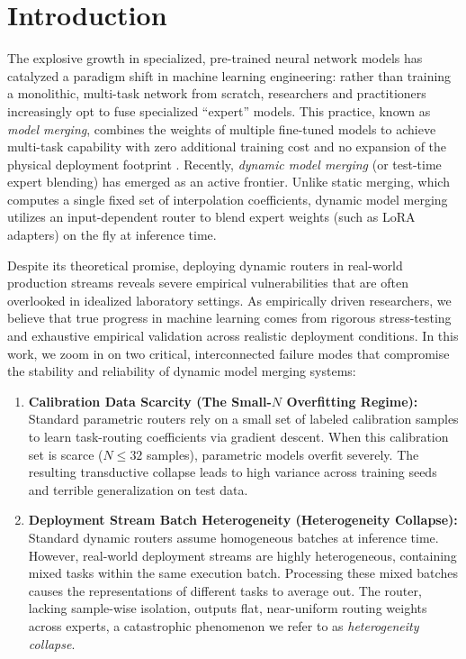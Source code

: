 \section{Introduction}
\label{sec:intro}

The explosive growth in specialized, pre-trained neural network models has catalyzed a paradigm shift in machine learning engineering: rather than training a monolithic, multi-task network from scratch, researchers and practitioners increasingly opt to fuse specialized ``expert'' models. This practice, known as \emph{model merging}, combines the weights of multiple fine-tuned models to achieve multi-task capability with zero additional training cost and no expansion of the physical deployment footprint \cite{Wortsman2022}. Recently, \emph{dynamic model merging} (or test-time expert blending) has emerged as an active frontier. Unlike static merging, which computes a single fixed set of interpolation coefficients, dynamic model merging utilizes an input-dependent router to blend expert weights (such as LoRA adapters) on the fly at inference time.

Despite its theoretical promise, deploying dynamic routers in real-world production streams reveals severe empirical vulnerabilities that are often overlooked in idealized laboratory settings. As empirically driven researchers, we believe that true progress in machine learning comes from rigorous stress-testing and exhaustive empirical validation across realistic deployment conditions. In this work, we zoom in on two critical, interconnected failure modes that compromise the stability and reliability of dynamic model merging systems:

\begin{enumerate}
    \item \textbf{Calibration Data Scarcity (The Small-$N$ Overfitting Regime):} Standard parametric routers rely on a small set of labeled calibration samples to learn task-routing coefficients via gradient descent. When this calibration set is scarce ($N \le 32$ samples), parametric models overfit severely. The resulting transductive collapse leads to high variance across training seeds and terrible generalization on test data.
    \item \textbf{Deployment Stream Batch Heterogeneity (Heterogeneity Collapse):} Standard dynamic routers assume homogeneous batches at inference time. However, real-world deployment streams are highly heterogeneous, containing mixed tasks within the same execution batch. Processing these mixed batches causes the representations of different tasks to average out. The router, lacking sample-wise isolation, outputs flat, near-uniform routing weights across experts, a catastrophic phenomenon we refer to as \emph{heterogeneity collapse}.
\end{enumerate}

